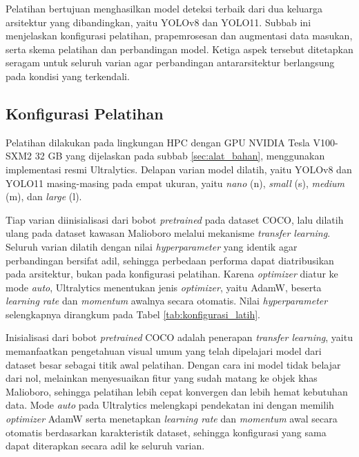 Pelatihan bertujuan menghasilkan model deteksi terbaik dari dua keluarga arsitektur yang 
dibandingkan, yaitu YOLOv8 dan YOLO11. Subbab ini menjelaskan konfigurasi pelatihan, 
prapemrosesan dan augmentasi data masukan, serta skema pelatihan dan perbandingan model. 
Ketiga aspek tersebut ditetapkan seragam untuk seluruh varian agar perbandingan 
antararsitektur berlangsung pada kondisi yang terkendali.

\subsection{Konfigurasi Pelatihan}

Pelatihan dilakukan pada lingkungan HPC dengan GPU NVIDIA Tesla V100-SXM2 32 GB yang 
dijelaskan pada subbab \ref{sec:alat_bahan}, menggunakan implementasi resmi Ultralytics. 
Delapan varian model dilatih, yaitu YOLOv8 dan YOLO11 masing-masing pada empat ukuran, 
yaitu \textit{nano} (n), \textit{small} (s), \textit{medium} (m), dan \textit{large} (l).

Tiap varian diinisialisasi dari bobot \textit{pretrained} pada dataset COCO, lalu dilatih 
ulang pada dataset kawasan Malioboro melalui mekanisme \textit{transfer learning}. Seluruh 
varian dilatih dengan nilai \textit{hyperparameter} yang identik agar perbandingan 
bersifat adil, sehingga perbedaan performa dapat diatribusikan pada arsitektur, bukan 
pada konfigurasi pelatihan. Karena \textit{optimizer} diatur ke mode \textit{auto}, 
Ultralytics menentukan jenis \textit{optimizer}, yaitu AdamW, beserta 
\textit{learning rate} dan \textit{momentum} awalnya secara otomatis. Nilai 
\textit{hyperparameter} selengkapnya dirangkum pada Tabel \ref{tab:konfigurasi_latih}.

Inisialisasi dari bobot \textit{pretrained} COCO adalah penerapan \textit{transfer 
learning}, yaitu memanfaatkan pengetahuan visual umum yang telah dipelajari model dari 
dataset besar sebagai titik awal pelatihan. Dengan cara ini model tidak belajar dari nol, 
melainkan menyesuaikan fitur yang sudah matang ke objek khas Malioboro, sehingga pelatihan 
lebih cepat konvergen dan lebih hemat kebutuhan data. Mode \textit{auto} pada Ultralytics 
melengkapi pendekatan ini dengan memilih \textit{optimizer} AdamW serta menetapkan 
\textit{learning rate} dan \textit{momentum} awal secara otomatis berdasarkan karakteristik 
dataset, sehingga konfigurasi yang sama dapat diterapkan secara adil ke seluruh varian.

